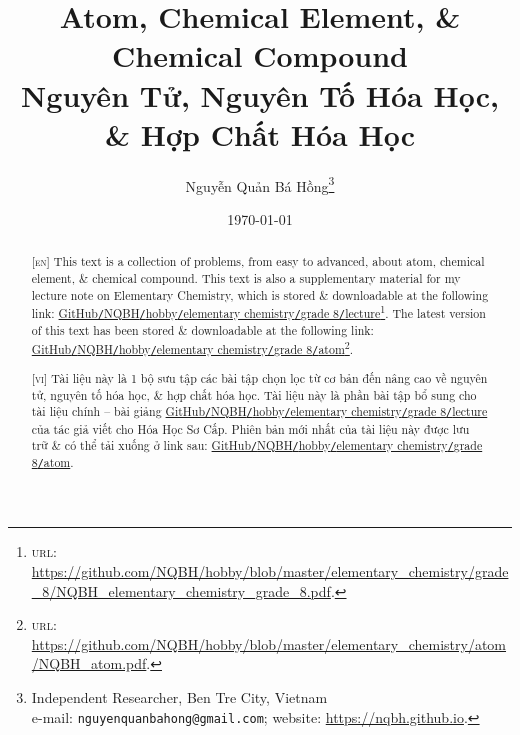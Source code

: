 \documentclass{article}
\title{Atom, Chemical Element, \& Chemical Compound\\Nguyên Tử, Nguyên Tố Hóa Học, \& Hợp Chất Hóa Học}
\author{Nguyễn Quản Bá Hồng\footnote{Independent Researcher, Ben Tre City, Vietnam\\e-mail: \texttt{nguyenquanbahong@gmail.com}; website: \url{https://nqbh.github.io}.}}
\date{\today}
\begin{document}
\maketitle
\begin{abstract}
	\textsc{[en]} This text is a collection of problems, from easy to advanced, about atom, chemical element, \& chemical compound. This text is also a supplementary material for my lecture note on Elementary Chemistry, which is stored \& downloadable at the following link: \href{https://github.com/NQBH/hobby/blob/master/elementary_chemistry/grade_8/NQBH_elementary_chemistry_grade_8.pdf}{GitHub\texttt{/}NQBH\texttt{/}hobby\texttt{/}elementary chemistry\texttt{/}grade 8\texttt{/}lecture}\footnote{\textsc{url}: \url{https://github.com/NQBH/hobby/blob/master/elementary_chemistry/grade_8/NQBH_elementary_chemistry_grade_8.pdf}.}. The latest version of this text has been stored \& downloadable at the following link: \href{https://github.com/NQBH/hobby/blob/master/elementary_chemistry/chemical_reaction/NQBH_chemical_reaction.pdf}{GitHub\texttt{/}NQBH\texttt{/}hobby\texttt{/}elementary chemistry\texttt{/}grade 8\texttt{/}atom}\footnote{\textsc{url}: \url{https://github.com/NQBH/hobby/blob/master/elementary_chemistry/atom/NQBH_atom.pdf}.}.
	\vspace{2mm}
	
	\textsc{[vi]} Tài liệu này là 1 bộ sưu tập các bài tập chọn lọc từ cơ bản đến nâng cao về nguyên tử, nguyên tố hóa học, \& hợp chất hóa học. Tài liệu này là phần bài tập bổ sung cho tài liệu chính -- bài giảng \href{https://github.com/NQBH/hobby/blob/master/elementary_chemistry/grade_8/NQBH_elementary_chemistry_grade_8.pdf}{GitHub\texttt{/}NQBH\texttt{/}hobby\texttt{/}elementary chemistry\texttt{/}grade 8\texttt{/}lecture} của tác giả viết cho Hóa Học Sơ Cấp. Phiên bản mới nhất của tài liệu này được lưu trữ \& có thể tải xuống ở link sau: \href{https://github.com/NQBH/hobby/blob/master/elementary_chemistry/grade_8/real/NQBH_real.pdf}{GitHub\texttt{/}NQBH\texttt{/}hobby\texttt{/}elementary chemistry\texttt{/}grade 8\texttt{/}atom}.
\end{abstract}
\setcounter{secnumdepth}{4}
\setcounter{tocdepth}{3}
\tableofcontents
\newpage

\end{document}
